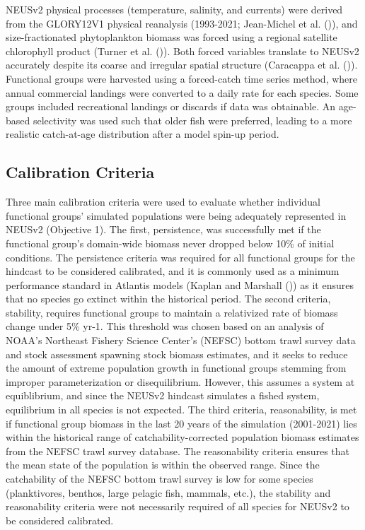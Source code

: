 \documentclass[
]{article}
\begin{document}
NEUSv2 physical processes (temperature, salinity, and currents) were derived from the GLORY12V1 physical reanalysis (1993-2021; Jean-Michel et al. ()), and size-fractionated phytoplankton biomass was forced using a regional satellite chlorophyll product (Turner et al. ()). Both forced variables translate to NEUSv2 accurately despite its coarse and irregular spatial structure (Caracappa et al. ()). Functional groups were harvested using a forced-catch time series method, where annual commercial landings were converted to a daily rate for each species. Some groups included recreational landings or discards if data was obtainable. An age-based selectivity was used such that older fish were preferred, leading to a more realistic catch-at-age distribution after a model spin-up period.

\subsection{Calibration Criteria}\label{calibration-criteria}

Three main calibration criteria were used to evaluate whether individual functional groups' simulated populations were being adequately represented in NEUSv2 (Objective 1). The first, persistence, was successfully met if the functional group's domain-wide biomass never dropped below 10\% of initial conditions. The persistence criteria was required for all functional groups for the hindcast to be considered calibrated, and it is commonly used as a minimum performance standard in Atlantis models (Kaplan and Marshall ()) as it ensures that no species go extinct within the historical period. The second criteria, stability, requires functional groups to maintain a relativized rate of biomass change under 5\% yr-1. This threshold was chosen based on an analysis of NOAA's Northeast Fishery Science Center's (NEFSC) bottom trawl survey data and stock assessment spawning stock biomass estimates, and it seeks to reduce the amount of extreme population growth in functional groups stemming from improper parameterization or disequilibrium. However, this assumes a system at equiblibrium, and since the NEUSv2 hindcast simulates a fished system, equilibrium in all species is not expected. The third criteria, reasonability, is met if functional group biomass in the last 20 years of the simulation (2001-2021) lies within the historical range of catchability-corrected population biomass estimates from the NEFSC trawl survey database. The reasonability criteria ensures that the mean state of the population is within the observed range. Since the catchability of the NEFSC bottom trawl survey is low for some species (planktivores, benthos, large pelagic fish, mammals, etc.), the stability and reasonability criteria were not necessarily required of all species for NEUSv2 to be considered calibrated.
\end{document}
